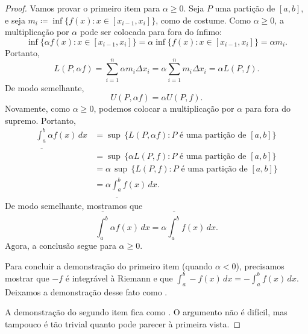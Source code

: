 \begin{proof}
\pagebreak[2]
Vamos provar o primeiro item para $\alpha \geq 0$.
Seja $P$ uma partição de $[a,b]$, e
seja $m_i \coloneqq \inf \bigl\{ f(x) : x \in [x_{i-1},x_i] \bigr\}$, como de costume.
Como $\alpha \geq 0$, a multiplicação por $\alpha$ pode ser colocada
para fora do ínfimo:
\begin{equation*}
\inf \bigl\{ \alpha f(x) : x \in [x_{i-1},x_i] \bigr\}
=
\alpha \inf \bigl\{ f(x) : x \in [x_{i-1},x_i] \bigr\} = \alpha m_i .
\end{equation*}
Portanto,
\begin{equation*}
L(P,\alpha f) =
\sum_{i=1}^n \alpha m_i \Delta x_i = \alpha \sum_{i=1}^n m_i \Delta x_i = \alpha
L(P,f).
\end{equation*}
De modo semelhante,
\begin{equation*}
U(P,\alpha f) = \alpha U(P,f) .
\end{equation*}
Novamente, como $\alpha \geq 0$, podemos colocar a multiplicação por $\alpha$
para fora do supremo. Portanto,
\begin{equation*}
\begin{split}
\underline{\int_a^b} \alpha f(x)\,dx & =
\sup \, \bigl\{ L(P,\alpha f) : P \text{ é uma partição de } [a,b] \bigr\}
\\
& =
\sup \, \bigl\{ \alpha L(P,f) : P \text{ é uma partição de } [a,b] \bigr\}
\\
& =
\alpha \,
\sup \, \bigl\{ L(P,f) : P \text{ é uma partição de } [a,b] \bigr\}
\\
& =
\alpha
\underline{\int_a^b} f(x)\,dx .
\end{split}
\end{equation*}
De modo semelhante, mostramos que
\begin{equation*}
\overline{\int_a^b} \alpha f(x)\,dx
=
\alpha
\overline{\int_a^b} f(x)\,dx .
\end{equation*}
Agora, a conclusão segue para $\alpha \geq 0$.

Para concluir a demonstração do primeiro item (quando $\alpha < 0$), precisamos
mostrar que $-f$ é integrável à Riemann e que
$\int_a^b - f(x)\,dx =
-
\int_a^b f(x)\,dx$. Deixamos a demonstração desse fato como
.

A demonstração do segundo item fica como
.
O argumento não é difícil, mas tampouco é tão
trivial quanto pode parecer à primeira vista.
\end{proof}

